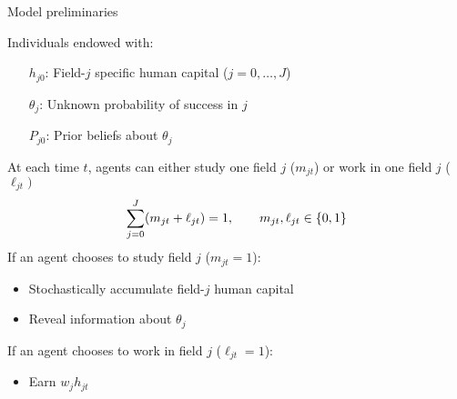 
\begin{frame}{Model preliminaries}




% 

Individuals endowed with:
\begin{itemize}
    \item [$h_{j0}$:] Field-$j$ specific human capital ($j=0,\dots,J$)
    \item [$\theta_j$:] Unknown probability of success in $j$
    \item [$P_{j0}$:] Prior beliefs about $\theta_j$
\end{itemize}



\vspace{2ex}
At each time $t$, agents can either study one field $j$ ($m_{jt}$) or work in one field $j$ ($\ell_{jt})$
\begin{equation*}
    \sum_{j=0}^J (m_{jt} + \ell_{jt}) = 1, \quad \quad m_{jt}, \ell_{jt} \in \{0, 1\}
\end{equation*}
If an agent chooses to study field $j$ ($m_{jt} = 1$):
  \begin{itemize}
    \item Stochastically accumulate field-$j$ human capital
    \item Reveal information about $\theta_j$
  \end{itemize}
If an agent chooses to work in field $j$ ($\ell_{jt} = 1$):
  \begin{itemize}
    \item Earn $w_j h_{jt}$
  \end{itemize}



\end{frame}
